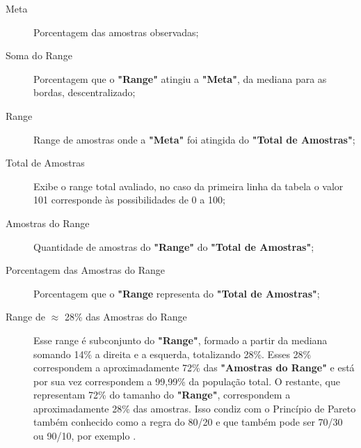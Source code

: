 \vspace{-8mm}
\begin{description}
   \item[Meta] Porcentagem das amostras observadas;
   \item[Soma do Range] Porcentagem que o \textbf{"Range"} atingiu a \textbf{"Meta"}, da mediana para as bordas, descentralizado;
   \item[Range] Range de amostras onde a \textbf{"Meta"} foi atingida do \textbf{"Total de Amostras"};
   \item[Total de Amostras] Exibe o range total avaliado, no caso da primeira linha da tabela o valor 101 corresponde às possibilidades de 0 a 100;
   \item[Amostras do Range] Quantidade de amostras do \textbf{"Range"} do \textbf{"Total de Amostras"};
   \item[Porcentagem das Amostras do Range] Porcentagem que o \textbf{"Range} representa do \textbf{"Total de Amostras"};
   \item[Range de $\approx$ 28\% das Amostras do Range] Esse range é  subconjunto do \textbf{"Range"}, formado a partir da mediana somando 14\% a direita e a esquerda, totalizando 28\%. Esses 28\% correspondem a aproximadamente 72\% das \textbf{"Amostras do Range"} e está por sua vez correspondem a 99,99\% da população total. O restante, que representam 72\% do tamanho do \textbf{"Range"}, correspondem a aproximadamente 28\% das amostras. Isso condiz com o Princípio de Pareto também conhecido como a regra do 80/20 e que também pode ser 70/30 ou 90/10, por exemplo \cite{administradores_principio_pareto}.
\end{description}
\bigbreak

